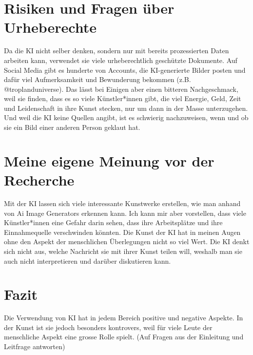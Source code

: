 \documentclass{article}
\begin{document}
\section{Risiken und Fragen über Urheberechte}
    Da die KI nicht selber denken, sondern nur mit bereits prozessierten Daten arbeiten kann, verwendet sie viele urheberechtlich geschützte Dokumente. Auf Social Media gibt es hunderte von Accounts, die KI-generierte Bilder posten und dafür viel Aufmerksamkeit und Bewunderung bekommen (z.B. @troplanduniverse). Das lässt bei Einigen aber einen bitteren Nachgeschmack, weil sie finden, dass es so viele Künstler*innen gibt, die viel Energie, Geld, Zeit und Leidenschaft in ihre Kunst stecken, nur um dann in der Masse unterzugehen. Und weil die KI keine Quellen angibt, ist es schwierig nachzuweisen, wenn und ob sie ein Bild einer anderen Person geklaut hat. 

\section{Meine eigene Meinung vor der Recherche}
    Mit der KI lassen sich viele interessante Kunstwerke erstellen, wie man anhand von Ai Image 
    Generators erkennen kann. Ich kann mir aber vorstellen, dass viele Künstler*innen eine Gefahr 
    darin sehen, dass ihre Arbeitsplätze und ihre Einnahmequelle verschwinden könnten. Die Kunst der KI 
    hat in meinen Augen ohne den Aspekt der menschlichen Überlegungen nicht so viel Wert. Die KI denkt 
    sich nicht aus, welche Nachricht sie mit ihrer Kunst teilen will, weshalb man sie auch nicht 
    interpretieren und darüber diskutieren kann.

\section{Fazit}
    Die Verwendung von KI hat in jedem Bereich positive und negative Aspekte. In der Kunst ist sie jedoch 
    besonders kontrovers, weil für viele Leute der menschliche Aspekt eine grosse Rolle spielt.
    (Auf Fragen aus der Einleitung und Leitfrage antworten)



\printbibliography
\end{document}
